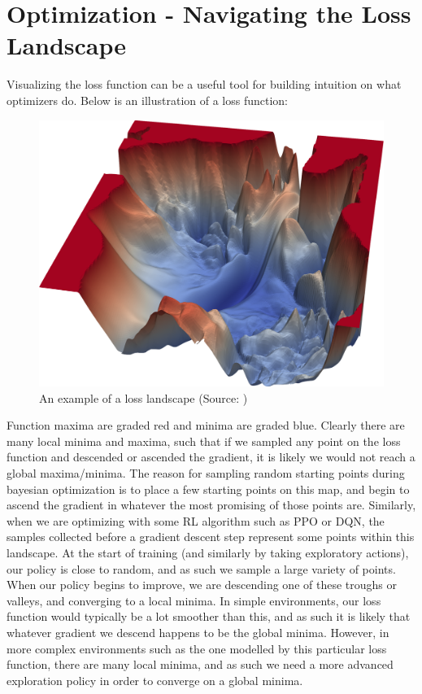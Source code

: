 \documentclass[12pt]{article}
\begin{document}
\section{Optimization - Navigating the Loss Landscape}\label{losscape}
Visualizing the loss function can be a useful tool for building intuition on what optimizers do. Below is an illustration of a loss function: 
\begin{figure}[H]
    \centering
    \includegraphics[scale=0.15]{30.png}
    \caption{An example of a loss landscape (Source: \textcite{umd})}
    \label{losshit}
\end{figure}
Function maxima are graded red and minima are graded blue. Clearly there are many local minima and maxima, such that if we sampled any point on the loss function and descended or ascended the gradient, it is likely we would not reach a global maxima/minima. The reason for sampling random starting points during bayesian optimization is to place a few starting points on this map, and begin to ascend the gradient in whatever the most promising of those points are. Similarly, when we are optimizing with some RL algorithm such as PPO or DQN, the samples collected before a gradient descent step represent some points within this landscape. At the start of training (and similarly by taking exploratory actions), our policy is close to random, and as such we sample a large variety of points. When our policy begins to improve, we are descending one of these troughs or valleys, and converging to a local minima. In simple environments, our loss function would typically be a lot smoother than this, and as such it is likely that whatever gradient we descend happens to be the global minima. However, in more complex environments such as the one modelled by this particular loss function, there are many local minima, and as such we need a more advanced exploration policy in order to converge on a global minima. \\\newline
\end{document}
